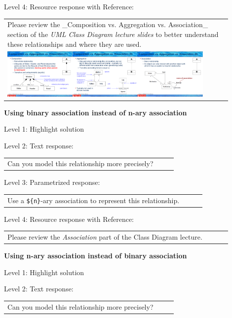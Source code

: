 \noindent Level 4: Resource response with Reference: \medskip

\begin{tabular}{|p{0.9\linewidth}}
Please review the _Composition vs. Aggregation vs. Association_ section of 
the \textit{UML Class Diagram lecture slides} to 
better understand these relationships and where they are used.

\\
\includegraphics[width=0.9\textwidth]{images/composition_aggregation_association.png}
\end{tabular} \medskip


\noindent \textbf{Using binary association instead of n-ary association} \medskip

\noindent Level 1: Highlight solution \medskip

\noindent Level 2: Text response: \medskip

\begin{tabular}{|p{0.9\linewidth}}
Can you model this relationship more precisely?
\end{tabular} \medskip

\noindent Level 3: Parametrized response: \medskip

\begin{tabular}{|p{0.9\linewidth}}
Use a \verb|${n}|-ary association to represent this relationship.
\end{tabular} \medskip

\noindent Level 4: Resource response with Reference: \medskip

\begin{tabular}{|p{0.9\linewidth}}
Please review the \textit{Association} part of the Class Diagram lecture.
\end{tabular} \medskip


\noindent \textbf{Using n-ary association instead of binary association} \medskip

\noindent Level 1: Highlight solution \medskip

\noindent Level 2: Text response: \medskip

\begin{tabular}{|p{0.9\linewidth}}
Can you model this relationship more precisely?
\end{tabular} \medskip

